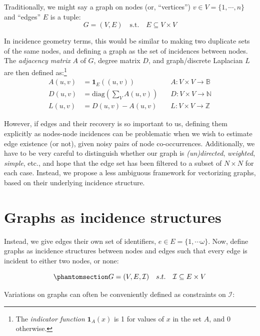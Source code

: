 \documentclass[%
	12pt,
		oneside,
		letterpaper
]{book}
\begin{document}
Traditionally\autocite{MathematicalfoundationsGraphBLAS_Kepner2016,WhyHowWhen_Torres2021},
we might say a graph on nodes (or, ``vertices'')
\(v\in V=\{1,\cdots,n\}\) and ``edges'' \(E\) is a tuple: \[
G=(V,E) \quad \textrm{s.t.} \quad E\subseteq V \times V
\]

In incidence geometry terms, this would be similar to making two
duplicate sets of the same nodes, and defining a graph as the set of
incidences between nodes. The \emph{adjacency matrix} \(A\) of \(G\),
degree matrix \(D\), and graph/discrete Laplacian \(L\) are then defined
as:\footnote{ The \emph{indicator function} \(\mathbf{1}_A(x)\) is 1 for
  values of \(x\) in the set \(A\), and 0 otherwise.} \[
\begin{aligned}
A(u,v) & =\mathbf{1}_E((u,v)) \quad &A : V\times V\rightarrow \mathbb{B} \\
D(u,v) & =\mathrm{diag}({\textstyle\sum}_V A(u,v))\quad &D : V\times V\rightarrow \mathbb{N} \\
L(u,v) & = D(u,v) - A(u,v) \quad &L : V\times V\rightarrow \mathbb{Z} 
\end{aligned}
\]

However, if edges and their recovery is so important to us, defining
them explicitly as nodes-node incidences can be problematic when we wish
to estimate edge existence (or not), given noisy pairs of node
co-occurrences. Additionally, we have to be very careful to distinguish
whether our graph is \emph{(un)directed}, \emph{weighted},
\emph{simple}, etc., and hope that the edge set has been filtered to a
subset of \(N\times N\) for each case. Instead, we propose a less
ambiguous framework for vectorizing graphs, based on their underlying
incidence structure.

\section{Graphs as incidence structures}\label{sec-incidence-vec}

Instead, we give edges their own set of identifiers,
\(e\in E=\{1,\cdots \omega\}\). Now, define graphs as incidence
structures between nodes and edges such that every edge is incident to
either two nodes, or none:

\begin{equation}\phantomsection\label{eq-simple-incidence}{
G = (V,E,\mathcal{I}) \quad s.t. \quad \mathcal{I} \subseteq E\times V
}\end{equation}

Variations on graphs can often be conveniently defined as constraints on
\(\mathcal{I}\):
\end{document}
